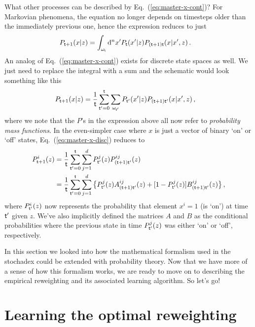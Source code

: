 What other processes can be described by Eq.~(\ref{eq:master-x-cont})? For Markovian phenomena, the equation no longer depends on timesteps older than the immediately previous one, hence the expression reduces to just
\begin{align}
P_{{\sf t}+1}(x\vert z) &= \int_{\omega_{\sf t}}{\rm d}^nx' P_{\sf t}(x'\vert z) P_{({\sf t}+1){\sf t}}(x\vert x',z) \label{eq:master-x-cont-markov} \,.
\end{align}
An analog of Eq.~(\ref{eq:master-x-cont}) exists for discrete state spaces as well. We just need to replace the integral with a sum and the schematic would look something like this
\begin{align}
P_{{\sf t}+1}(x\vert z) &= \frac{1}{{\sf t}}\sum_{{\sf t}'=0}^{\sf t}\sum_{\omega_{{\sf t}'}} P_{{\sf t}'}(x'\vert z) P_{({\sf t}+1){\sf t}'}(x \vert x', z) \label{eq:master-x-disc} \,,
\end{align}
where we note that the $P$'s in the expression above all now refer to \emph{probability mass functions}. In the even-simpler case where $x$ is just a vector of binary `on' or `off' states, Eq.~(\ref{eq:master-x-disc}) reduces to
\begin{align}
P^i_{{\sf t}+1}(z) &= \frac{1}{{\sf t}}\sum_{{\sf t}'=0}^{\sf t} \sum_{j=1}^d P^j_{{\sf t}'}(z) P^{ij}_{({\sf t}+1){\sf t}'}(z) \nonumber \\
&= \frac{1}{{\sf t}}\sum_{{\sf t}'=0}^{\sf t} \sum_{j=1}^d \big\{ P^j_{{\sf t}'}(z) A^{ij}_{({\sf t}+1){\sf t}'}(z) + [1-P^j_{{\sf t}'}(z)] B^{ij}_{({\sf t}+1){\sf t}'}(z) \big\} \label{eq:master-x-disc-binary}\,,
\end{align}
where $P^i_{{\sf t}'}(z)$ now represents the probability that element $x^i=1$ (is `on') at time ${\sf t}'$ given $z$. We've also implicitly defined the matrices $A$ and $B$ as the conditional probabilities where the previous state in time $P^j_{{\sf t}'}(z)$ was either `on' or `off', respectively.

In this section we looked into how the mathematical formalism used in the stochadex could be extended with probability theory. Now that we have more of a sense of how this formalism works, we are ready to move on to describing the empirical reweighting and its associated learning algorithm. So let's go!

\section{\sffamily Learning the optimal reweighting}

